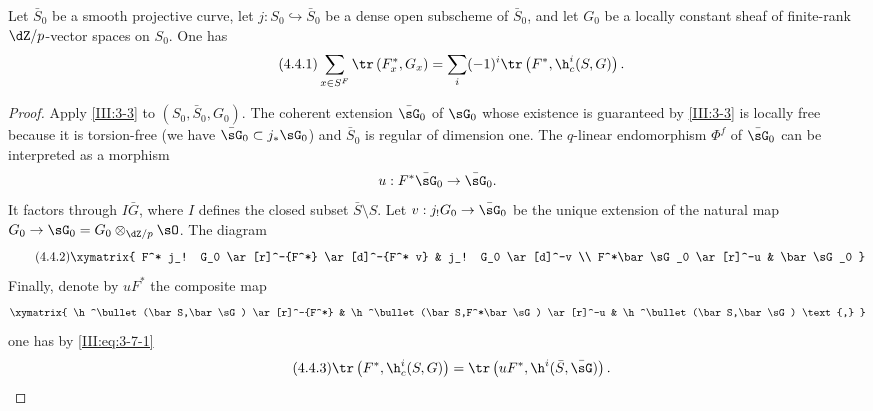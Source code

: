 \documentclass[oneside]{book}
\begin{document}
\begin{theorem_}\label{III:4-1bis}
Let $\bar S_0$ be a smooth projective curve, let
$j:S_0\hookrightarrow \bar S_0$ be a dense open subscheme of $\bar S_0$,
and let $G_0$ be a locally constant sheaf of finite-rank $\dZ/p$-vector
spaces on $S_0$. One has
\begin{equation*}\tag{4.4.1}\label{III:eq:4-4-1}
  \sum_{x\in S^F} \tr\left(F_x^*,G_x\right) = \sum_i (-1)^i \tr\left(F^*,\h_c^i(S,G)\right) \text{.}
\end{equation*}
\end{theorem_}
\begin{proof}
Apply \ref{III:3-3} to $(S_0,\bar S_0,G_0)$. The coherent extension
$\bar\sG_0$ of $\sG_0$ whose existence is guaranteed by \ref{III:3-3} is
locally free because it is torsion-free (we have
$\bar\sG_0\subset j_*\sG_0$) and $\bar S_0$ is regular of dimension one. The
$q$-linear endomorphism $\Phi^f$ of $\bar\sG_0$ can be interpreted as a
morphism
\[
  u : F^*\bar\sG_0 \to \bar\sG_0 \text{.}
\]
It factors through $I\bar G$, where $I$ defines the closed subset
$\bar S\setminus S$. Let $v:j_!G_0 \to \bar\sG_0$ be the unique extension of
the natural map $G_0 \to \sG_0 = G_0\otimes_{\dZ/p}\sO$. The diagram
\begin{equation*}\tag{4.4.2}\label{III:eq:4-4-2}
\xymatrix{
  F^* j_! G_0 \ar[r]^-{F^*} \ar[d]^-{F^* v}
    & j_! G_0 \ar[d]^-v \\
  F^*\bar \sG_0 \ar[r]^-u
    & \bar\sG_0
}
\end{equation*}
Finally, denote by $u F^*$ the composite map
\[\xymatrix{
  \h^\bullet(\bar S,\bar\sG) \ar[r]^-{F^*}
    & \h^\bullet(\bar S,F^*\bar\sG) \ar[r]^-u
    & \h^\bullet(\bar S,\bar\sG) \text{,}
}\]
one has by \eqref{III:eq:3-7-1}
\begin{equation*}\tag{4.4.3}\label{III:eq:4-4-3}
  \tr\left(F^*,\h_c^i(S,G)\right) = \tr\left(u F^*,\h^i(\bar S,\bar\sG)\right) \text{.}
\end{equation*}


\end{proof}
\end{document}
